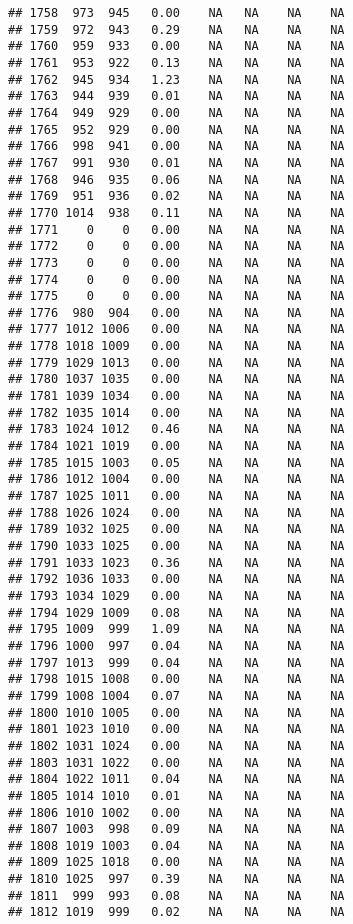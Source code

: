 \documentclass{article}\usepackage{graphicx, color}
\makeatletter
\newenvironment{kframe}{%
 \def\at@end@of@kframe{}%
 \ifinner\ifhmode%
  \def\at@end@of@kframe{\end{minipage}}%
  \begin{minipage}{\columnwidth}%
 \fi\fi%
 \def\FrameCommand##1{\hskip\@totalleftmargin \hskip-\fboxsep
 \colorbox{shadecolor}{##1}\hskip-\fboxsep
     \hskip-\linewidth \hskip-\@totalleftmargin \hskip\columnwidth}%
 \MakeFramed {\advance\hsize-\width
   \@totalleftmargin\z@ \linewidth\hsize
   \@setminipage}}%
 {\par\unskip\endMakeFramed%
 \at@end@of@kframe}
\newenvironment{knitrout}{}{} %
\makeatother
\begin{document}
\begin{knitrout}
\begin{kframe}
\begin{verbatim}
## 1758  973  945   0.00    NA   NA    NA    NA
## 1759  972  943   0.29    NA   NA    NA    NA
## 1760  959  933   0.00    NA   NA    NA    NA
## 1761  953  922   0.13    NA   NA    NA    NA
## 1762  945  934   1.23    NA   NA    NA    NA
## 1763  944  939   0.01    NA   NA    NA    NA
## 1764  949  929   0.00    NA   NA    NA    NA
## 1765  952  929   0.00    NA   NA    NA    NA
## 1766  998  941   0.00    NA   NA    NA    NA
## 1767  991  930   0.01    NA   NA    NA    NA
## 1768  946  935   0.06    NA   NA    NA    NA
## 1769  951  936   0.02    NA   NA    NA    NA
## 1770 1014  938   0.11    NA   NA    NA    NA
## 1771    0    0   0.00    NA   NA    NA    NA
## 1772    0    0   0.00    NA   NA    NA    NA
## 1773    0    0   0.00    NA   NA    NA    NA
## 1774    0    0   0.00    NA   NA    NA    NA
## 1775    0    0   0.00    NA   NA    NA    NA
## 1776  980  904   0.00    NA   NA    NA    NA
## 1777 1012 1006   0.00    NA   NA    NA    NA
## 1778 1018 1009   0.00    NA   NA    NA    NA
## 1779 1029 1013   0.00    NA   NA    NA    NA
## 1780 1037 1035   0.00    NA   NA    NA    NA
## 1781 1039 1034   0.00    NA   NA    NA    NA
## 1782 1035 1014   0.00    NA   NA    NA    NA
## 1783 1024 1012   0.46    NA   NA    NA    NA
## 1784 1021 1019   0.00    NA   NA    NA    NA
## 1785 1015 1003   0.05    NA   NA    NA    NA
## 1786 1012 1004   0.00    NA   NA    NA    NA
## 1787 1025 1011   0.00    NA   NA    NA    NA
## 1788 1026 1024   0.00    NA   NA    NA    NA
## 1789 1032 1025   0.00    NA   NA    NA    NA
## 1790 1033 1025   0.00    NA   NA    NA    NA
## 1791 1033 1023   0.36    NA   NA    NA    NA
## 1792 1036 1033   0.00    NA   NA    NA    NA
## 1793 1034 1029   0.00    NA   NA    NA    NA
## 1794 1029 1009   0.08    NA   NA    NA    NA
## 1795 1009  999   1.09    NA   NA    NA    NA
## 1796 1000  997   0.04    NA   NA    NA    NA
## 1797 1013  999   0.04    NA   NA    NA    NA
## 1798 1015 1008   0.00    NA   NA    NA    NA
## 1799 1008 1004   0.07    NA   NA    NA    NA
## 1800 1010 1005   0.00    NA   NA    NA    NA
## 1801 1023 1010   0.00    NA   NA    NA    NA
## 1802 1031 1024   0.00    NA   NA    NA    NA
## 1803 1031 1022   0.00    NA   NA    NA    NA
## 1804 1022 1011   0.04    NA   NA    NA    NA
## 1805 1014 1010   0.01    NA   NA    NA    NA
## 1806 1010 1002   0.00    NA   NA    NA    NA
## 1807 1003  998   0.09    NA   NA    NA    NA
## 1808 1019 1003   0.04    NA   NA    NA    NA
## 1809 1025 1018   0.00    NA   NA    NA    NA
## 1810 1025  997   0.39    NA   NA    NA    NA
## 1811  999  993   0.08    NA   NA    NA    NA
## 1812 1019  999   0.02    NA   NA    NA    NA

\end{verbatim}
\end{kframe}
\end{knitrout}
\end{document}
